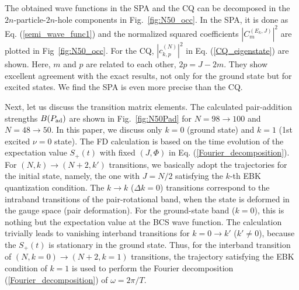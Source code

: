 \documentclass[%
superscriptaddress,
preprint,
showpacs,
nofootinbib,
amsmath,amssymb,
prc,
floatfix ]%
{revtex4-1}
\begin{document}
The obtained wave functions in the SPA and the CQ can be decomposed in the
$2n$-particle-$2n$-hole components in Fig.~\ref{fig:N50_occ}.
In the SPA, it is done as Eq. (\ref{semi_wave_func1}) and
the normalized squared coefficients $|C_m^{(E_k,J)}|^2$ are plotted
in Fig~\ref{fig:N50_occ}.
For the CQ, $|c_{k,p}^{(N)}|^2$ in Eq. (\ref{CQ_eigenstate}) are shown.
Here, $m$ and $p$ are related to each other, $2p=J-2m$.
They show excellent agreement with the exact results, not only for the
ground state but for excited states.
We find the SPA is even more precise than the CQ.

Next, let us discuss the transition matrix elements.
The calculated pair-addition strengths $B(P_{\rm ad})$ are shown in
Fig.~\ref{fig:N50Pad} for $N=98\rightarrow 100$ and $N=48\rightarrow 50$.
In this paper, we discuss only $k=0$ (ground state) and $k=1$
(1st excited $\nu=0$ state).
The FD calculation is based on the time evolution of the expectation 
value $S_+(t)$ with fixed $(J,\Phi)$ in Eq. (\ref{Fourier_decomposition}).
For $(N,k)\rightarrow (N+2,k')$ transitions,
we basically adopt the trajectories for the initial state, namely,
the one with $J=N/2$ satisfying the $k$-th EBK quantization condition.
The $k\rightarrow k$ ($\Delta k = 0$)  transitions
correspond to the intraband transitions of the
pair-rotational band, when the state is deformed in the
gauge space (pair deformation).
For the ground-state band ($k=0$),
this is nothing but the expectation value at the BCS wave function.
The calculation trivially leads to vanishing interband transitions for 
$k=0\rightarrow k'$ ($k'\neq 0$), because the $S_+(t)$ is stationary
in the ground state.
Thus, for the interband transition of $(N,k=0)\rightarrow (N+2,k=1)$
transitions, the trajectory satisfying the EBK condition of $k=1$ is used to
perform the Fourier decomposition (\ref{Fourier_decomposition})
of $\omega=2\pi/T$.
\end{document}

